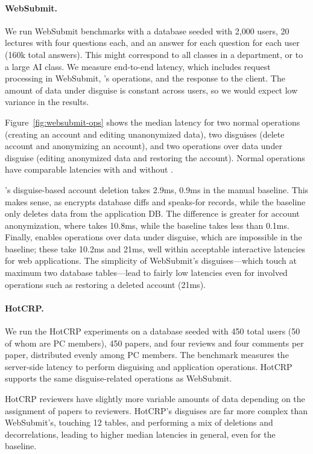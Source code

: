 \paragraph{WebSubmit.}
%
We run WebSubmit benchmarks with a database seeded with 2,000 users, 20
lectures with four questions each, and an answer for each question for
each user (160k total answers).
%
This might correspond to all classes in a department, or to a large AI class.
%
We measure end-to-end latency, which includes request processing in WebSubmit,
\sys's operations, and the response to the client.
%
The amount of data under disguise is constant across users, so we would expect
low variance in the results.
%

%
Figure~\ref{fig:websubmit-ops} shows the median latency for two normal operations
(creating an account and editing unanonymized data), two disguises (delete account
and anonymizing an account), and two operations over data under disguise (editing
anonymized data and restoring the account).
%
Normal operations have comparable latencies with and without \sys.
%

%
\sys's disguise-based account deletion takes 2.9ms, \vs 0.9ms in the manual
baseline.
%
This makes sense, as \sys encrypts database diffs and speaks-for records, while
the baseline only deletes data from the application DB.
%
The difference is greater for account anonymization, where \sys takes 10.8ms,
while the baseline takes less than 0.1ms.
%
Finally, \sys enables operations over data under disguise, which are impossible in
the baseline; these take 10.2ms and 21ms, well within acceptable interactive
latencies for web applications.
%
The simplicity of WebSubmit's disguises---which touch at maximum two database
tables---lead to fairly low latencies even for involved operations such as
restoring a deleted account (21ms).
%

\paragraph{HotCRP.}
%
We run the HotCRP experiments on a database seeded with 450 total users (50 of
whom are PC members), 450 papers, and four reviews and four comments per paper,
distributed evenly among PC members.
%
The benchmark measures the server-side latency to perform disguising and
application operations.
%
HotCRP supports the same disguise-related operations as WebSubmit.
%

HotCRP reviewers have slightly more variable amounts of data  depending on the
assignment of papers to reviewers. HotCRP's disguises are far more complex than
WebSubmit's, touching 12 tables, and performing a mix of deletions and
decorrelations, leading to higher median latencies in general, even for the baseline.


